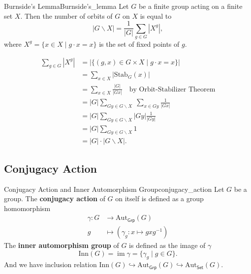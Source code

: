 \begin{theorem}{Burnside's Lemma}{Burnside's_lemma}
    Let $G$ be a finite group acting on a finite set $X$. Then the number of orbits of $G$ on $X$ is equal to
    \[
        |G\backslash X|=\frac{1}{|G|}\sum_{g\in G}|X^g|    ,
    \]
    where $X^g=\{x\in X\mid g\cdot x=x\}$ is the set of fixed points of $g$.
\end{theorem}

\begin{prf}
    \begin{align*}
        \sum_{g \in G}\left|X^g\right| & =|\{(g, x) \in G \times X \mid g \cdot x=x\}|                                        \\
                                       & =\sum_{x \in X}\left|\mathrm{Stab}_G(x)\right|                                       \\
                                       & =\sum_{x \in X}\frac{|G|}{\left|G x\right|} \quad \text{by Orbit-Stabilizer Theorem} \\
                                       & =|G| \sum_{G y \in G \backslash X}\; \sum_{x \in Gy}\frac{1}{\left|G x\right|}       \\
                                       & =|G| \sum_{G y \in G \backslash X} \left|Gy\right|\frac{1}{\left|G y\right|}         \\
                                       & =|G| \sum_{G y \in G \backslash X} 1                                                 \\
                                       & =|G| \cdot|G \backslash X|.
    \end{align*}

\end{prf}



\subsection{Conjugacy Action}
\begin{definition}{Conjugacy Action and Inner Automorphism Group}{conjugacy_action}
    Let $G$ be a group. The \textbf{conjugacy action} of $G$ on itself is defined as a group homomorphism
    \begin{align*}
        \gamma:G & \longrightarrow \mathrm{Aut}_{\mathsf{Grp}}(G) \\
        g        & \longmapsto (\gamma_g: x\longmapsto gxg^{-1})
    \end{align*}
    The \textbf{inner automorphism group} of $G$ is defined as the image of $\gamma$
    $$
        \mathrm{Inn}(G)=\operatorname{im}\gamma=\{ \gamma_g\mid g\in G\}.
    $$
    And we have inclusion relation $\mathrm{Inn}(G)\hookrightarrow\mathrm{Aut}_{\mathsf{Grp}}(G)\hookrightarrow\mathrm{Aut}_{\mathsf{Set}}(G)$.
\end{definition}

